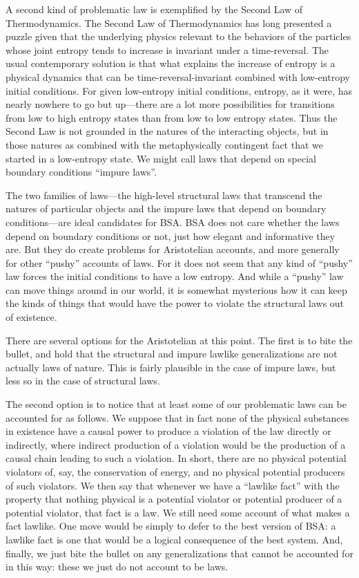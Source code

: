 A second kind of problematic law is exemplified by the Second Law of Thermodynamics. The Second Law of Thermodynamics
has long presented a puzzle given that the underlying physics relevant to the behaviors of the particles whose joint entropy tends to increase
is invariant under a time-reversal. The usual contemporary solution is that what explains the increase of entropy is a physical dynamics
that can be time-reversal-invariant combined with low-entropy initial conditions. For given low-entropy initial conditions,
entropy, as it were, has nearly nowhere to go but up---there are a lot more possibilities for transitions from low to high entropy states
than from low to low entropy states. Thus the Second Law is not grounded in the natures of the interacting objects, 
but in those natures as combined with the metaphysically contingent fact that we started in a low-entropy state.  We might 
call laws that depend on special boundary conditions ``impure laws''. 

The two families of laws---the high-level structural laws that transcend the natures of particular objects and the impure
laws that depend on boundary conditions---are ideal candidates for BSA. BSA does not care whether the laws depend on boundary
conditions or not, just how elegant and informative they are. But they do create problems for Aristotelian accounts, 
and more generally for other ``pushy'' accounts of laws. For it does not seem that any kind of ``pushy'' law 
forces the initial conditions to have a low entropy. And while a ``pushy'' law can move things around in our world, it is
somewhat mysterious how it can keep the kinds of things that would have the power to violate the structural laws out of 
existence.

There are several options for the Aristotelian at this point. The first is to bite the bullet, and hold that the structural
and impure lawlike generalizations are not actually laws of nature. This is fairly plausible in the case of impure laws, but
less so in the case of structural laws. 

The second option is to notice that at least some of our problematic laws can be accounted for as follows. We
suppose that in fact none of the physical substances in existence have a causal power to produce a violation of the law directly
or indirectly, where indirect production of a violation would be the production of a causal chain leading to such a violation.
In short, there are no physical potential violators of, say, the conservation of energy, and no physical potential producers of 
such violators. We then say that whenever we have a ``lawlike fact'' with the property that nothing physical is a potential violator
or potential producer of a potential violator, that fact is a law. We still need some account of what makes a fact lawlike. One move would be simply to defer to the best version of BSA: a lawlike
fact is one that would be a logical consequence of the best system. And, finally, we just bite the bullet on any generalizations that
cannot be accounted for in this way: these we just do not account to be laws.

